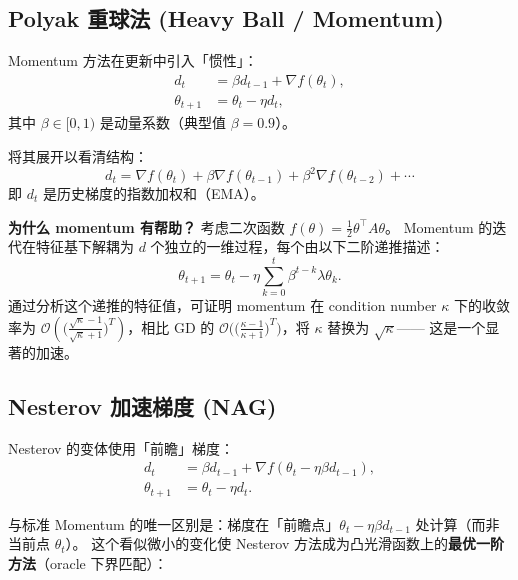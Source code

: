 \documentclass[12pt,a4paper]{ctexart}
\theoremstyle{definition}
\theoremstyle{plain}
\newcommand{\grad}{\nabla}
\begin{document}
\subsection{Polyak 重球法 (Heavy Ball / Momentum)}

Momentum 方法在更新中引入「惯性」：
\begin{equation}\label{eq:momentum}
  \begin{aligned}
    d_t &= \beta d_{t-1} + \grad f(\theta_t), \\
    \theta_{t+1} &= \theta_t - \eta d_t,
  \end{aligned}
\end{equation}
其中 $\beta \in [0,1)$ 是动量系数（典型值 $\beta = 0.9$）。

将其展开以看清结构：
\begin{equation}
  d_t = \grad f(\theta_t) + \beta \grad f(\theta_{t-1}) + \beta^2 \grad f(\theta_{t-2}) + \cdots
\end{equation}
即 $d_t$ 是历史梯度的指数加权和（EMA）。

\textbf{为什么 momentum 有帮助？} 考虑二次函数 $f(\theta) = \frac12\theta^\top A\theta$。
Momentum 的迭代在特征基下解耦为 $d$ 个独立的一维过程，每个由以下二阶递推描述：
\begin{equation}
  \theta_{t+1} = \theta_t - \eta \sum_{k=0}^{t}\beta^{t-k} \lambda \theta_k.
\end{equation}
通过分析这个递推的特征值，可证明 momentum 在 condition number $\kappa$ 下的收敛率为
$\mathcal{O}\left(\big(\frac{\sqrt{\kappa}-1}{\sqrt{\kappa}+1}\big)^T\right)$，相比 GD 的
$\mathcal{O}\big(\big(\frac{\kappa-1}{\kappa+1}\big)^T\big)$，将 $\kappa$ 替换为 $\sqrt{\kappa}$——
这是一个显著的加速。

\subsection{Nesterov 加速梯度 (NAG)}

Nesterov 的变体使用「前瞻」梯度：
\begin{equation}\label{eq:nesterov}
  \begin{aligned}
    d_t &= \beta d_{t-1} + \grad f(\theta_t - \eta \beta d_{t-1}), \\
    \theta_{t+1} &= \theta_t - \eta d_t.
  \end{aligned}
\end{equation}

与标准 Momentum 的唯一区别是：梯度在「前瞻点」$\theta_t - \eta \beta d_{t-1}$ 处计算（而非当前点 $\theta_t$）。
这个看似微小的变化使 Nesterov 方法成为凸光滑函数上的\textbf{最优一阶方法}（oracle 下界匹配）：
\end{document}
